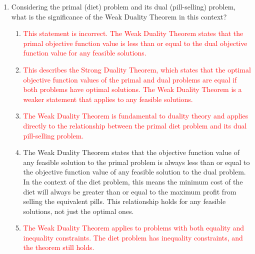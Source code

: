 \documentclass{article}%
\newcommand{\incorrect}[1]{\textcolor{red}{#1}}
\begin{document}
\begin{enumerate}
\begin{enumerate}
\item \incorrect{This is a description of the primal problem, which aims to minimize the total cost of food while meeting minimum nutrient requirements.}%
\item \incorrect{This is not the correct interpretation of either the primal or dual problem. The dual problem focuses on profit maximization, not nutrient maximization.}%
\item \incorrect{This is a description of the primal problem, which aims to find the optimal food combination to minimize cost while meeting nutrient requirements.}%
\end{enumerate}%
\vspace{1em}%
\item Considering the primal (diet) problem and its dual (pill-selling) problem, what is the significance of the Weak Duality Theorem in this context?%
\begin{enumerate}%
\item \incorrect{This statement is incorrect. The Weak Duality Theorem states that the primal objective function value is less than or equal to the dual objective function value for any feasible solutions.}%
\item \incorrect{This describes the Strong Duality Theorem, which states that the optimal objective function values of the primal and dual problems are equal if both problems have optimal solutions. The Weak Duality Theorem is a weaker statement that applies to any feasible solutions.}%
\item \incorrect{The Weak Duality Theorem is fundamental to duality theory and applies directly to the relationship between the primal diet problem and its dual pill-selling problem.}%
\item The Weak Duality Theorem states that the objective function value of any feasible solution to the primal problem is always less than or equal to the objective function value of any feasible solution to the dual problem. In the context of the diet problem, this means the minimum cost of the diet will always be greater than or equal to the maximum profit from selling the equivalent pills. This relationship holds for any feasible solutions, not just the optimal ones.%
\item \incorrect{The Weak Duality Theorem applies to problems with both equality and inequality constraints.  The diet problem has inequality constraints, and the theorem still holds.}%
\end{enumerate}%
\vspace{1em}%

\end{enumerate}
\end{document}
